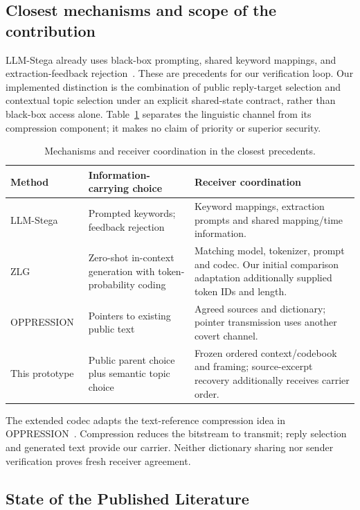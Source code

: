 \subsection{Closest mechanisms and scope of the contribution}
LLM-Stega already uses black-box prompting, shared keyword mappings, and extraction-feedback rejection~\cite{wu2024generative}. These are precedents for our verification loop. Our implemented distinction is the combination of public reply-target selection and contextual topic selection under an explicit shared-state contract, rather than black-box access alone. Table~\ref{tab:mechanism-comparison} separates the linguistic channel from its compression component; it makes no claim of priority or superior security.
\begin{table}[H]
\centering\small
\caption{Mechanisms and receiver coordination in the closest precedents.}
\label{tab:mechanism-comparison}
\begin{tabularx}{\columnwidth}{|l|X|X|}
\hline
Method & Information-carrying choice & Receiver coordination \\
\hline
LLM-Stega~\cite{wu2024generative} & Prompted keywords; feedback rejection & Keyword mappings, extraction prompts and shared mapping/time information. \\
\hline
ZLG~\cite{lin2024zero} & Zero-shot in-context generation with token-probability coding & Matching model, tokenizer, prompt and codec. Our initial comparison adaptation additionally supplied token IDs and length. \\
\hline
OPPRESSION~\cite{zillien2024oppression} & Pointers to existing public text & Agreed sources and dictionary; pointer transmission uses another covert channel. \\
\hline
This prototype & Public parent choice plus semantic topic choice & Frozen ordered context/codebook and framing; source-excerpt recovery additionally receives carrier order. \\
\hline
\end{tabularx}
\end{table}
The extended codec adapts the text-reference compression idea in OPPRESSION~\cite{zillien2024oppression}. Compression reduces the bitstream to transmit; reply selection and generated text provide our carrier. Neither dictionary sharing nor sender verification proves fresh receiver agreement.

\subsection{State of the Published Literature}
\label{sec:related-rq1}

